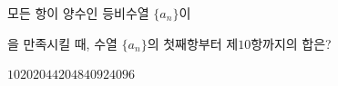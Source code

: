모든 항이 양수인 등비수열 $\{a_n\}$이 \par\smallskip{}\par\smallskip\noindent 을 만족시킬 때, 수열 $\{a_n\}$의 첫째항부터 제$10$항까지의 합은?
\begin{choices32}{$1020$}{$2044$}{$2048$}{$4092$}{$4096$}\end{choices32}
